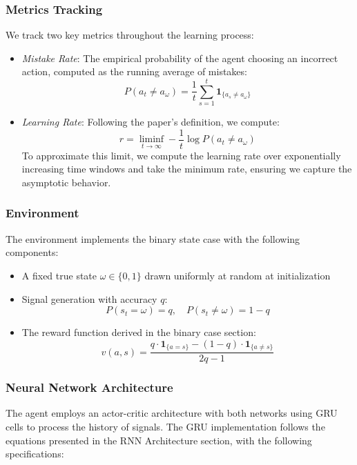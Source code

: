 \subsubsection*{Metrics Tracking}
We track two key metrics throughout the learning process:

\begin{itemize}
    \item \textit{Mistake Rate}: The empirical probability of the agent choosing an incorrect action, computed as the running average of mistakes:
    \[
        P(a_t \neq a_\omega) = \frac{1}{t}\sum_{s=1}^t \mathbf{1}_{\{a_s \neq a_\omega\}}
    \]
    
    \item \textit{Learning Rate}: Following the paper's definition, we compute:
    \[
        r = \liminf_{t \to \infty} -\frac{1}{t} \log P(a_t \neq a_\omega)
    \]
    To approximate this limit, we compute the learning rate over exponentially increasing time windows and take the minimum rate, ensuring we capture the asymptotic behavior.
\end{itemize}

\subsubsection*{Environment}
The environment implements the binary state case with the following components:

\begin{itemize}
    \item A fixed true state $\omega \in \{0,1\}$ drawn uniformly at random at initialization
    \item Signal generation with accuracy $q$:
    \[
        P(s_t = \omega) = q, \quad P(s_t \neq \omega) = 1-q
    \]
    \item The reward function derived in the binary case section:
    \[
        v(a,s) = \frac{q \cdot \mathbf{1}_{\{a = s\}} - (1-q) \cdot \mathbf{1}_{\{a \neq s\}}}{2q-1}
    \]
\end{itemize}

\subsubsection*{Neural Network Architecture}
The agent employs an actor-critic architecture with both networks using GRU cells to process the history of signals. The GRU implementation follows the equations presented in the RNN Architecture section, with the following specifications:

